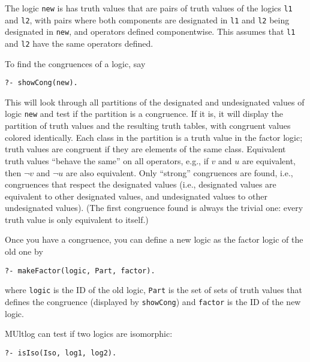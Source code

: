 \documentclass[]{article}
\newcommand{\passthrough}[1]{#1}
\begin{document}
The logic \passthrough{\lstinline!new!} is has truth values that are
pairs of truth values of the logics \passthrough{\lstinline!l1!} and
\passthrough{\lstinline!l2!}, with pairs where both components are
designated in \passthrough{\lstinline!l1!} and
\passthrough{\lstinline!l2!} being designated in
\passthrough{\lstinline!new!}, and operators defined componentwise. This
assumes that \passthrough{\lstinline!l1!} and
\passthrough{\lstinline!l2!} have the same operators defined.

To find the congruences of a logic, say

\begin{lstlisting}
?- showCong(new).
\end{lstlisting}

This will look through all partitions of the designated and undesignated
values of logic \passthrough{\lstinline!new!} and test if the partition
is a congruence. If it is, it will display the partition of truth values
and the resulting truth tables, with congruent values colored
identically. Each class in the partition is a truth value in the factor
logic; truth values are congruent if they are elements of the same
class. Equivalent truth values ``behave the same'' on all operators,
e.g., if \(v\) and \(u\) are equivalent, then \(\lnot v\) and
\(\lnot u\) are also equivalent. Only ``strong'' congruences are found,
i.e., congruences that respect the designated values (i.e., designated
values are equivalent to other designated values, and undesignated
values to other undesignated values). (The first congruence found is
always the trivial one: every truth value is only equivalent to itself.)

Once you have a congruence, you can define a new logic as the factor
logic of the old one by

\begin{lstlisting}
?- makeFactor(logic, Part, factor).
\end{lstlisting}

where \passthrough{\lstinline!logic!} is the ID of the old logic,
\passthrough{\lstinline!Part!} is the set of sets of truth values that
defines the congruence (displayed by \passthrough{\lstinline!showCong!})
and \passthrough{\lstinline!factor!} is the ID of the new logic.

MUltlog can test if two logics are isomorphic:

\begin{lstlisting}
?- isIso(Iso, log1, log2).
\end{lstlisting}
\end{document}
